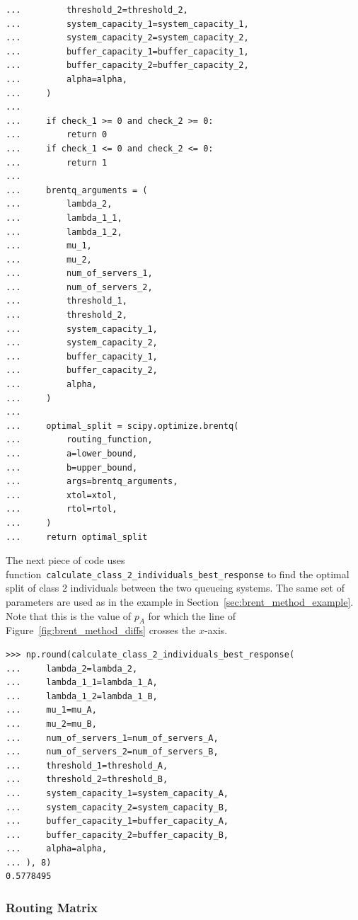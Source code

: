 \begin{lstlisting}[style=pystyle]
...         threshold_2=threshold_2,
...         system_capacity_1=system_capacity_1,
...         system_capacity_2=system_capacity_2,
...         buffer_capacity_1=buffer_capacity_1,
...         buffer_capacity_2=buffer_capacity_2,
...         alpha=alpha,
...     )
...
...     if check_1 >= 0 and check_2 >= 0:
...         return 0
...     if check_1 <= 0 and check_2 <= 0:
...         return 1
...
...     brentq_arguments = (
...         lambda_2,
...         lambda_1_1,
...         lambda_1_2,
...         mu_1,
...         mu_2,
...         num_of_servers_1,
...         num_of_servers_2,
...         threshold_1,
...         threshold_2,
...         system_capacity_1,
...         system_capacity_2,
...         buffer_capacity_1,
...         buffer_capacity_2,
...         alpha,
...     )
...
...     optimal_split = scipy.optimize.brentq(
...         routing_function,
...         a=lower_bound,
...         b=upper_bound,
...         args=brentq_arguments,
...         xtol=xtol,
...         rtol=rtol,
...     )
...     return optimal_split

\end{lstlisting}

The next piece of code uses
function~\lstinline[style=pystyle]{calculate_class_2_individuals_best_response}
to find the optimal split of class 2 individuals between the two queueing
systems.
The same set of parameters are used as in the example in
Section~\ref{sec:brent_method_example}.
Note that this is the value of \(p_A\) for which the line of
Figure~\ref{fig:brent_method_diffs} crosses the \(x\)-axis.

\begin{lstlisting}[style=pystyle]
>>> np.round(calculate_class_2_individuals_best_response(
...     lambda_2=lambda_2,
...     lambda_1_1=lambda_1_A,
...     lambda_1_2=lambda_1_B,
...     mu_1=mu_A,
...     mu_2=mu_B,
...     num_of_servers_1=num_of_servers_A,
...     num_of_servers_2=num_of_servers_B,
...     threshold_1=threshold_A,
...     threshold_2=threshold_B,
...     system_capacity_1=system_capacity_A,
...     system_capacity_2=system_capacity_B,
...     buffer_capacity_1=buffer_capacity_A,
...     buffer_capacity_2=buffer_capacity_B,
...     alpha=alpha,
... ), 8)
0.5778495

\end{lstlisting}


\subsubsection{Routing Matrix}

